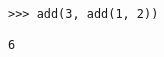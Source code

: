 \begin{blocksection}
\question \begin{lstlisting}
>>> add(3, add(1, 2))
\end{lstlisting}

\begin{solution}[0.5in]
\begin{verbatim}
6
\end{verbatim}
\end{solution}
\end{blocksection}
